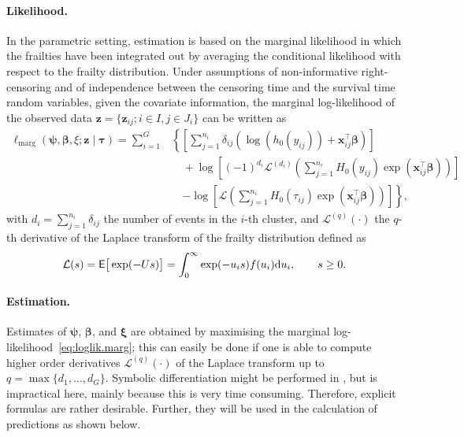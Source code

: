\paragraph{Likelihood.}
In the parametric setting, estimation is based on the marginal likelihood
  in which the frailties have been integrated out by averaging the conditional likelihood
  with respect to the frailty distribution.
Under assumptions
  of non-informative right-censoring and of
  independence between the censoring time and the survival time random variables,
  given the covariate information,
  the marginal log-likelihood of the observed data $\bm z = \{ \bm z_{ij} ; i\in I, j \in J_i \}$
  can be written as \citep{vandenBergDrepper12}
\begin{align}
  \ell_{\mathrm{marg}}(\bm\psi, \bm\beta, \xi; \bm z \mid \bm \tau) =
    \sum_{i=1}^G &\left\{
      \left[ \sum_{j=1}^{n_i}
        \delta_{ij} \left( \log(h_0(y_{ij})) + \bm x_{ij}^\top\bm\beta \right)
      \right]\right.
      \nonumber \\
      &\quad + \log \left[ (-1)^{d_i} \mathcal L^{(d_i)} \left(
        \sum_{j=1}^{n_i} H_0(y_{ij}) \exp(\bm x_{ij}^\top\bm\beta)
      \right) \right]
      \nonumber \\
      &\quad \left.-\log \left[ \mathcal L\left(
        \sum_{j=1}^{n_i} H_0(\tau_{ij}) \exp(\bm x_{ij}^\top\bm\beta)
      \right) \right]
    \right\},
  \label{eq:loglik.marg}
\end{align}
  with $d_i = \sum_{j=1}^{n_i} \delta_{ij}$ the number of events in the $i$-th cluster, and
  $\mathcal L^{(q)}(\cdot)$ the $q$-th derivative of the Laplace transform of the frailty distribution
    defined as
  \[
    \mathcal{L} ( s ) = \mathsf{E}\big[ \exp(-Us) \big] =
      \int_{0}^{\infty} \exp ( - u_{i} s ) f ( u_{i} ) \mathrm{d}u_{i}, \qquad s \geq 0.
  \]

\paragraph{Estimation.}
Estimates of $\bm{\psi}$, $\bm{\beta}$, and $\bm{\xi}$ are obtained by maximising
  the marginal log-likelihood~\ref{eq:loglik.marg};
this can easily be done if one is able to compute higher order derivatives
  $\mathcal{L}^{( q )} ( \cdot )$ of the Laplace transform up to $q = \max \{ d_{1}, \ldots, d_{G} \}$.
Symbolic differentiation might be performed in ,
  but is impractical here, mainly because this is very time consuming.
Therefore, explicit formulas are rather desirable.
Further, they will be used in the calculation of predictions as shown below.

